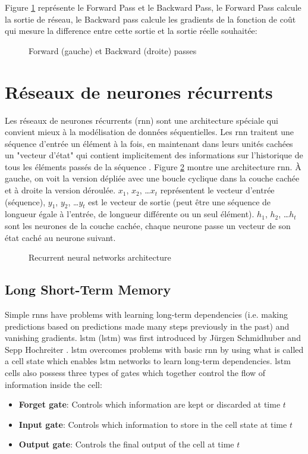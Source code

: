 Figure \ref{fig:forward-backward-pass} représente le Forward Pass et le Backward Pass, le Forward Pass calcule la sortie de réseau, le Backward pass calcule les gradients de la fonction de coût qui mesure la difference entre cette sortie et la sortie réelle souhaitée:

\begin{figure}[h]
    \centering
	
    \caption{Forward (gauche) et Backward (droite) passes}
    \label{fig:forward-backward-pass}
\end{figure}


\section{Réseaux de neurones récurrents}
Les réseaux de neurones récurrents (\acrshort{rnn}) sont une architecture spéciale qui convient mieux à la modélisation de données séquentielles. Les \acrshort{rnn} traitent une séquence d'entrée un élément à la fois, en maintenant dans leurs unités cachées un "vecteur d'état" qui contient implicitement des informations sur l'historique de tous les éléments passés de la séquence \cite{LeCun2015}. Figure \ref{fig:rnn} montre une architecture \acrshort{rnn}. À gauche, on voit la version dépliée avec une boucle cyclique dans la couche cachée et à droite la version déroulée. $x_1$, $x_2$, …$x_t$ représentent le vecteur d'entrée (séquence), $y_1$, $y_2$, …$y_t$ est le vecteur de sortie (peut être une séquence de longueur égale à l'entrée, de longueur différente ou un seul élément). $h_1$, $h_2$, …$h_t$ sont les neurones de la couche cachée, chaque neurone passe un vecteur de son état caché au neurone suivant.

\begin{figure}[H]
    \centering
    
    \caption{Recurrent neural networks architecture}
    \label{fig:rnn}
\end{figure}

\subsection{Long Short-Term Memory}
\label{section:lstm}
Simple \acrshort{rnn}s have problems with learning long-term dependencies (i.e. making predictions based on predictions made many steps previously in the past) and vanishing gradients. \acrlong{lstm} (\acrshort{lstm}) was first introduced by Jürgen Schmidhuber and Sepp Hochreiter \cite{Hochreiter1997}. \acrshort{lstm} overcomes problems with basic \acrshort{rnn} by using what is called a cell state which enables \acrshort{lstm} networks to learn long-term dependencies. \acrshort{lstm} cells also possess three types of gates which together control the flow of information inside the cell:
\begin{itemize}
    \item \textbf{Forget gate}: Controls which information are kept or discarded at time $t$
    \item \textbf{Input gate}: Controls which information to store in the cell state at time $t$
    \item \textbf{Output gate}: Controls the final output of the cell at time $t$
\end{itemize}

